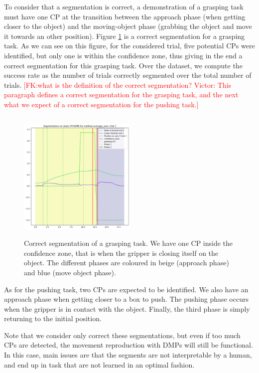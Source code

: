 \documentclass[conference]{IEEEtran}
\newcommand{\fk}[1]{\textcolor{red}{[FK:#1]}}
\begin{document}
To consider that a segmentation is correct, a demonstration of a grasping task must have one CP at the transition between the approach phase (when getting closer to the object) and the moving-object phase (grabbing the object and move it towards an other position). 
Figure \ref{fig:coloredseg} is a correct segmentation for a grasping task. As we can see on this figure, for the considered trial, five potential CPs were identified, but only one is within the confidence zone, thus giving in the end a correct segmentation for this grasping task. Over the dataset, we compute the success rate as the number of trials correctly segmented over the total number of trials.
\fk{what is the definition of the correct segmentation? \newline
Victor: This paragraph defines a correct segmentation for the grasping task, and the next what we expect of a correct segmentation for the pushing task.}

\begin{figure}[t]
  \centering
  \includegraphics[width=0.5\textwidth,height=2.5in]{img/resolSeg.png}
  \caption{Correct segmentation of a grasping task. We have one CP inside the confidence zone, that is when the gripper is closing itself on the object. The different phases are coloured in beige (approach phase) and blue (move object phase).}
  \label{fig:coloredseg}
\end{figure}

As for the pushing task, two CPs are expected to be identified. We also have an approach phase when getting closer to a box to push. The pushing phase occurs when the gripper is in contact with the object. Finally, the third phase is simply returning to the initial position.

Note that we consider only correct these segmentations, but even if too much CPs are detected, the movement reproduction with DMPs will still be functional. In this case, main issues are that the segments are not interpretable by a human, and end up in task that are not learned in an optimal fashion.
\end{document}
